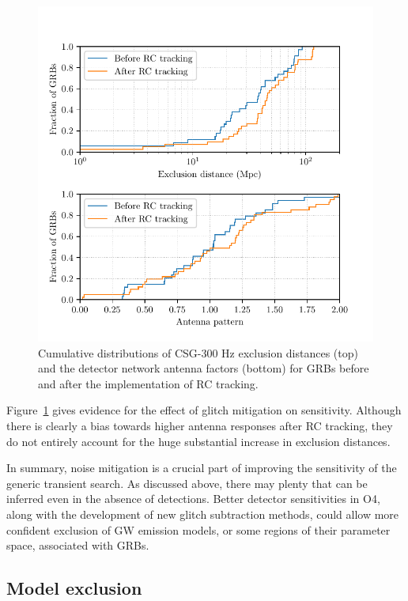 \begin{figure}[h]
  \centering
  \includegraphics{figures/grb/compare-rc.pdf}
  \caption
	{Cumulative distributions of CSG-300 Hz exclusion distances (top) and the detector network antenna factors (bottom) for GRBs before and after the implementation of RC tracking.}
  \label{fig:grb-o3b-compare-rc}
\end{figure}

Figure~\ref{fig:grb-o3b-compare-rc} gives evidence for the effect of glitch mitigation on \xpip sensitivity.
Although there is clearly a bias towards higher antenna responses after RC tracking, they do not entirely account for the huge substantial increase in exclusion distances.

In summary, noise mitigation is a crucial part of improving the sensitivity of the generic transient search.
As discussed above, there may plenty that can be inferred even in the absence of detections.
Better detector sensitivities in \ac{O4}, along with the development of new glitch subtraction methods, could allow more confident exclusion of GW emission models, or some regions of their parameter space, associated with GRBs.


\subsection{Model exclusion}\label{sec:grb-o3b-models}


